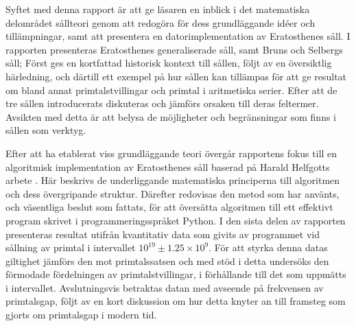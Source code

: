 Syftet med denna rapport är att ge läsaren en inblick i det matematiska delområdet sållteori genom att redogöra för dess grundläggande idéer och tillämpningar,
samt att presentera en datorimplementation av Eratosthenes såll.
%
I rapporten presenteras
Eratosthenes generaliserade såll,
samt Bruns och Selbergs såll;
Först ges en kortfattad historisk kontext till sållen,
följt av en översiktlig härledning,
och därtill ett exempel på hur sållen kan tillämpas
för att ge resultat om bland annat primtalstvillingar och primtal i aritmetiska serier.
%
Efter att de tre sållen introducerats diskuteras och jämförs orsaken till deras feltermer.
Avsikten med detta är att belysa de möjligheter och begränsningar som finns i sållen som verktyg.
%

%
Efter att ha etablerat viss grundläggande teori
övergår rapportens fokus till en algoritmisk implementation av Eratosthenes såll baserad på Harald Helfgotts arbete \cite{HaraldSieve}.
%
Här beskrivs de underliggande matematiska principerna till algoritmen och dess övergripande struktur. 
Därefter redovisas den metod som har använts, och väsentliga beslut som fattats,
för att översätta algoritmen till ett effektivt program skrivet i programmeringsspråket Python.
%
I den sista delen av rapporten presenteras resultat utifrån kvantitativ data som givits av programmet vid sållning av primtal i intervallet \(10^{19}\pm 1.25\times10^9\).
För att styrka denna datas giltighet jämförs den mot primtalssatsen och med stöd i detta undersöks den förmodade fördelningen av primtalstvillingar, i förhållande till det som uppmätts i intervallet.
Avslutningsvis betraktas datan med avseende på frekvensen av primtalsgap, följt av en kort diskussion om hur detta knyter an till framsteg som gjorts om primtalsgap i modern tid.


